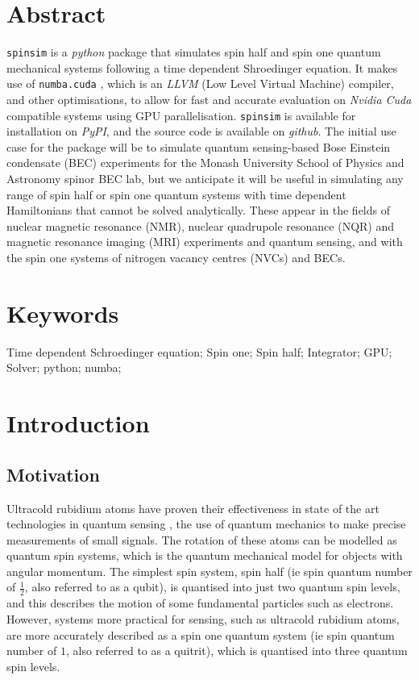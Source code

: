 \documentclass{jors}
\begin{document}
\section{Abstract}
	\texttt{spinsim} is a \emph{python} package that simulates spin half and spin one quantum mechanical systems following a time dependent Shroedinger equation. It makes use of \texttt{numba.cuda} \cite{lam_numba_2015}, which is an \emph{LLVM} (Low Level Virtual Machine) \cite{lattner_llvm_2004} compiler, and other optimisations, to allow for fast and accurate evaluation on \emph{Nvidia Cuda} \cite{nickolls_scalable_2008} compatible systems using GPU parallelisation. \texttt{spinsim} is available for installation on \emph{PyPI}, and the source code is available on \emph{github}. The initial use case for the package will be to simulate quantum sensing-based Bose Einstein condensate (BEC) experiments for the Monash University School of Physics and Astronomy spinor BEC lab, but we anticipate it will be useful in simulating any range of spin half or spin one quantum systems with time dependent Hamiltonians that cannot be solved analytically. These appear in the fields of nuclear magnetic resonance (NMR), nuclear quadrupole resonance (NQR) and magnetic resonance imaging (MRI) experiments and quantum sensing, and with the spin one systems of nitrogen vacancy centres (NVCs) and BECs.

\section{Keywords}
Time dependent Schroedinger equation; Spin one; Spin half; Integrator; GPU; Solver; python; numba;

\section{Introduction}
\subsection{Motivation}
	Ultracold rubidium atoms have proven their effectiveness in state of the art technologies in quantum sensing \cite{degen_quantum_2017}, the use of quantum mechanics to make precise measurements of small signals. The rotation of these atoms can be modelled as quantum spin systems, which is the quantum mechanical model for objects with angular momentum. The simplest spin system, spin half (ie spin quantum number of \(\frac12\), also referred to as a qubit), is quantised into just two quantum spin levels, and this describes the motion of some fundamental particles such as electrons. However, systems more practical for sensing, such as ultracold rubidium atoms, are more accurately described as a spin one quantum system (ie spin quantum number of \(1\), also referred to as a quitrit), which is quantised into three quantum spin levels.
	
\end{document}
